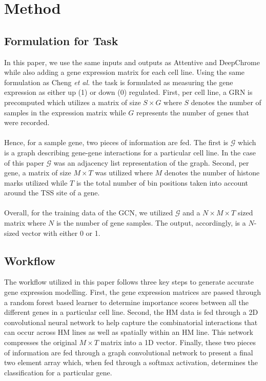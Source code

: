 \section{Method}
\subsection{Formulation for Task} 
In this paper, we use the same inputs and outputs as Attentive and DeepChrome while also adding a gene expression matrix for each cell line. Using the same formulation as Cheng \emph{et al.} the task is formulated as measuring the gene expression as either up (1) or down (0) regulated. First, per cell line, a GRN is precomputed which utilizes a matrix of size $S\times G$ where $S$ denotes the number of samples in the expression matrix while $G$ represents the number of genes that were recorded. \\\\
Hence, for a sample gene, two pieces of information are fed. The first is $\mathcal{G}$ which is a graph describing gene-gene interactions for a particular cell line. In the case of this paper $\mathcal{G}$ was an adjacency list representation of the graph. Second, per gene, a matrix of size $M\times T$ was utilized where $M$ denotes the number of histone marks utilized while $T$ is the total number of bin positions taken into account around the TSS site of a gene. \\\\
Overall, for the training data of the GCN, we utilized $\mathcal{G}$ and a $N\times M\times T$ sized matrix where $N$ is the number of gene samples. The output, accordingly, is a $N$-sized vector with either 0 or 1.

\subsection{Workflow}
The workflow utilized in this paper follows three key steps to generate accurate gene expression modelling. First, the gene expression matrices are passed through a random forest based learner to determine importance scores between all the different genes in a particular cell line. Second, the HM data is fed through a 2D convolutional neural network to help capture the combinatorial interactions that can occur across HM lines as well as spatially within an HM line. This network compresses the original $M\times T$ matrix into a 1D vector. Finally, these two pieces of information are fed through a graph convolutional network to present a final two element array which, when fed through a softmax activation,  determines the classification for a particular gene.


